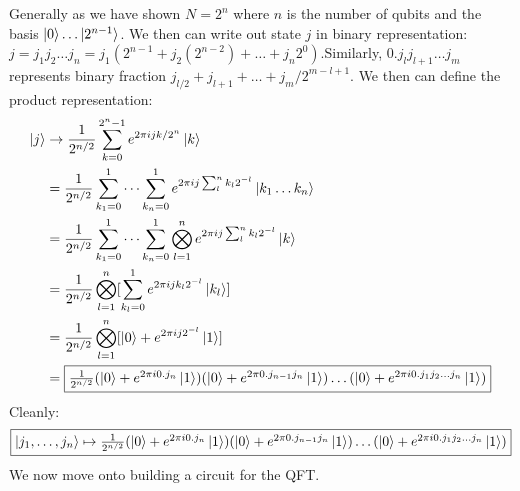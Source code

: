 \documentclass{article}
\begin{document}
Generally as we have shown $N=2^n$ where $n$ is the number of qubits and the basis $\ket0 \dots \ket{2^{n-1}}$. We then can write out state $j$ in binary representation: $j = j_1j_2\dots j_n = j_1(2^{n-1} + j_2(2^{n-2}) + \dots + j_n 2^0)$.Similarly, $0.j_l j_{l+1} \dots j_m$ represents binary fraction $j_{l/2} + j_{l+1} + \dots + j_m / 2^{m-l+1}$. We then can define the product representation:
\begin{align*}
	\ket{j} &\to \frac{1}{2^{n/2}} \sum^{2^n-1}_{k=0} e^{2\pi i j k/2^n} \ket{k}\\
		&= \frac{1}{2^{n/2}} \sum^1_{k_1=0}\dots \sum^1_{k_n= 0} e^{2\pi ij \sum^n_l k_l 2^{-l}}\ket{k_1\dots k_n}\\
		&= \frac{1}{2^{n/2}} \sum^1_{k_1=0}\dots \sum^1_{k_n= 0} \bigotimes^n_{l=1} e^{2\pi ij \sum^n_l k_l 2^{-l}}\ket{k}\\
		&= \frac{1}{2^{n/2}} \bigotimes^n_{l=1} [\sum^1_{k_l = 0} e^{2\pi i jk_l 2^{-l}} \ket{k_l}]\\
		&= \frac{1}{2^{n/2}} \bigotimes^n_{l=1} [\ket0 + e^{2\pi i j 2^{-l}}\ket{1}]\\
		&= \fbox{$\frac{1}{2^{n/2}}(\ket0 + e^{2\pi i 0.j_n }\ket1)(\ket0 + e^{2\pi 0.j_{n-1}j_n}\ket1)\dots(\ket0 + e^{2\pi i 0.j_1j_2\dots j_n} \ket1)$}
\end{align*}
Cleanly:
$$\fbox{$\ket{j_1,\dots,j_n} \mapsto \frac{1}{2^{n/2}}(\ket0 + e^{2\pi i 0.j_n }\ket1)(\ket0 + e^{2\pi 0.j_{n-1}j_n}\ket1)\dots(\ket0 + e^{2\pi i 0.j_1j_2\dots j_n} \ket1)$}$$
We now move onto building a circuit for the QFT.\\
\end{document}
